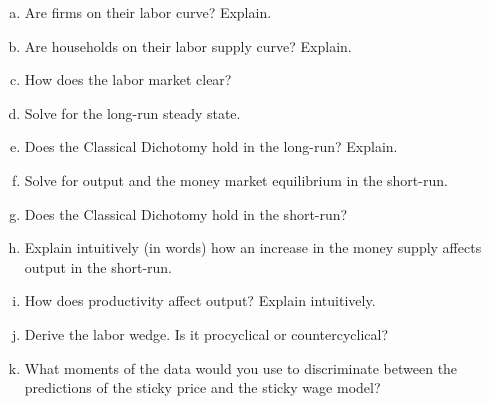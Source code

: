 \documentclass{article}
\newcommand{\1}{\mathbf{1}}
\begin{document}
\begin{enumerate}[(a)]
	\item Are firms on their labor curve? Explain.
	\item Are households on their labor supply curve? Explain.
	\item How does the labor market clear?
	\item Solve for the long-run steady state.
	\item Does the Classical Dichotomy hold in the long-run? Explain.
	\item Solve for output and the money market equilibrium in the short-run.
	\item Does the Classical Dichotomy hold in the short-run? 
	\item Explain intuitively (in words) how an increase in the money supply affects output in the short-run.
	\item How does productivity affect output? Explain intuitively.
	\item Derive the labor wedge. Is it procyclical or countercyclical?
	\item What moments of the data would you use to discriminate between the predictions of the sticky price and the sticky wage model?
\end{enumerate}
\end{document}
